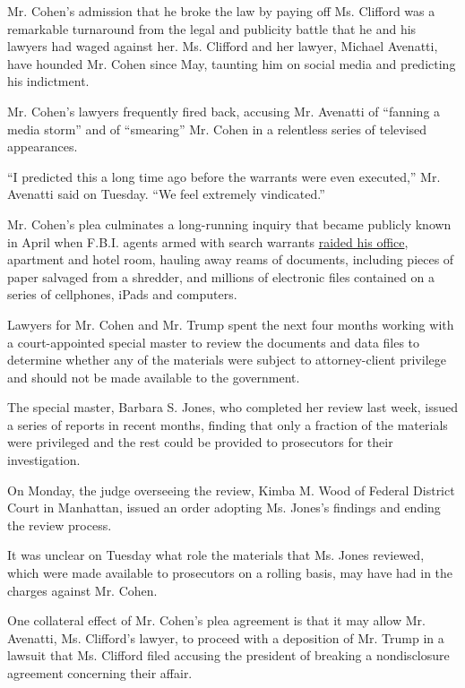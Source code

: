 Mr. Cohen's admission that he broke the law by paying off Ms. Clifford
was a remarkable turnaround from the legal and publicity battle that he
and his lawyers had waged against her. Ms. Clifford and her lawyer,
Michael Avenatti, have hounded Mr. Cohen since May, taunting him on
social media and predicting his indictment.

Mr. Cohen's lawyers frequently fired back, accusing Mr. Avenatti of
``fanning a media storm'' and of ``smearing'' Mr. Cohen in a relentless
series of televised appearances.

``I predicted this a long time ago before the warrants were even
executed,'' Mr. Avenatti said on Tuesday. ``We feel extremely
vindicated.''

Mr. Cohen's plea culminates a long-running inquiry that became publicly
known in April when F.B.I. agents armed with search warrants
\href{https://www.nytimes.com/2018/04/09/us/politics/fbi-raids-office-of-trumps-longtime-lawyer-michael-cohen.html}{raided
his office}, apartment and hotel room, hauling away reams of documents,
including pieces of paper salvaged from a shredder, and millions of
electronic files contained on a series of cellphones, iPads and
computers.

Lawyers for Mr. Cohen and Mr. Trump spent the next four months working
with a court-appointed special master to review the documents and data
files to determine whether any of the materials were subject to
attorney-client privilege and should not be made available to the
government.

The special master, Barbara S. Jones, who completed her review last
week, issued a series of reports in recent months, finding that only a
fraction of the materials were privileged and the rest could be provided
to prosecutors for their investigation.

On Monday, the judge overseeing the review, Kimba M. Wood of Federal
District Court in Manhattan, issued an order adopting Ms. Jones's
findings and ending the review process.

It was unclear on Tuesday what role the materials that Ms. Jones
reviewed, which were made available to prosecutors on a rolling basis,
may have had in the charges against Mr. Cohen.

One collateral effect of Mr. Cohen's plea agreement is that it may allow
Mr. Avenatti, Ms. Clifford's lawyer, to proceed with a deposition of Mr.
Trump in a lawsuit that Ms. Clifford filed accusing the president of
breaking a nondisclosure agreement concerning their affair.

